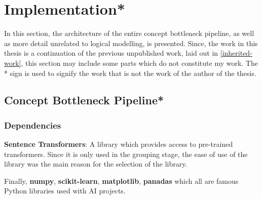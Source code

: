

\chapter{Implementation*}

In this section, the architecture of the entire concept bottleneck pipeline, as well as more detail unrelated to logical modelling, is presented.
Since, the work in this thesis is a continuation of the previous unpublished work, laid out in \autoref{inherited-work}, this section may include some parts which do not constitute my work. 
The * sign is used to signify the work that is not the work of the author of the thesis.


\section{Concept Bottleneck Pipeline*}

\subsection{Dependencies}

\textbf{Sentence Transformers}: A library which provides access to pre-trained transformers. 
Since it is only used in the grouping stage, the ease of use of the library was the main reason for the selection of the library.


Finally, \textbf{numpy}, \textbf{scikit-learn}, \textbf{matplotlib}, \textbf{panadas} which all are famous Python libraries used with AI projects. \\
